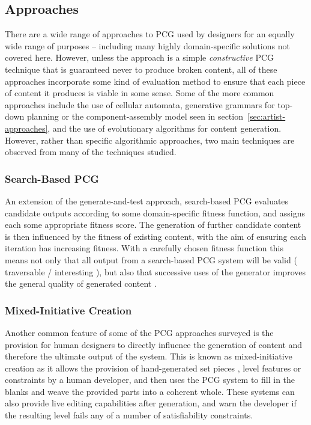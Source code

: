 \documentclass{acm_proc_article-sp}
\begin{document}
\subsection{Approaches}
There are a wide range of approaches to PCG used by designers for an equally wide range of purposes -- including many highly domain-specific solutions not covered here. However, unless the approach is a simple \textit{constructive} PCG technique that is guaranteed never to produce broken content, all of these approaches incorporate some kind of evaluation method to ensure that each piece of content it produces is viable in some sense. Some of the more common approaches include the use of cellular automata, generative grammars for top-down planning or the component-assembly model seen in section~\ref{sec:artist-approaches}, and the use of evolutionary algorithms for content generation.
However, rather than specific algorithmic approaches, two main techniques are observed from many of the techniques studied.

\subsubsection{Search-Based PCG}
An extension of the generate-and-test approach, search-based PCG evaluates candidate outputs according to some domain-specific fitness function, and assigns each some appropriate fitness score. The generation of further candidate content is then influenced by the fitness of existing content, with the aim of ensuring each iteration has increasing fitness. With a carefully chosen fitness function this means not only that all output from a search-based PCG system will be valid ( traversable / interesting ), but also that successive uses of the generator improves the general quality of generated content \cite{togelius2011search}.

\subsubsection{Mixed-Initiative Creation}
Another common feature of some of the PCG approaches surveyed is the provision for human designers to directly influence the generation of content and therefore the ultimate output of the system. This is known as mixed-initiative creation as it allows the provision of hand-generated set pieces \cite{smith2010tanagra}, level features \cite{mawhorter2010procedural} or constraints \cite{smelik2011semantic} by a human developer, and then uses the PCG system to fill in the blanks and weave the provided parts into a coherent whole. These systems can also provide live editing capabilities after generation, and warn the developer if the resulting level fails any of a number of satisfiability constraints.
\newpage
\end{document}
